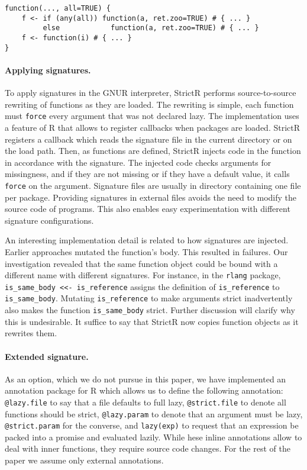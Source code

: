 \documentclass[review,nonacm,screen,acmsmall,anonymous=true]{acmart}
\newcommand{\code}[1]{\lstinline |#1|\xspace}
\renewcommand{\c}[1]{\lstinline |#1|\xspace}
\newcommand{\strictr}{{\sf StrictR}\xspace}
\begin{document}
\begin{lstlisting}
function(..., all=TRUE) {
    f <- if (any(all)) function(a, ret.zoo=TRUE) # { ... }
         else            function(a, ret.zoo=TRUE) # { ... }
    f <- function(i) # { ... }
}
\end{lstlisting}

\paragraph{Applying signatures.}
To apply signatures in the GNUR interpreter, \strictr performs source-to-source
rewriting of functions as they are loaded. The rewriting is simple, each
function must \c{force} every argument that was not declared lazy. The
implementation uses a feature of R that allows to register callbacks when
packages are loaded. \strictr registers a callback which reads the signature
file in the current directory or on the load path. Then, as functions are
defined, \strictr injects code in the function in accordance with the signature.
The injected code checks arguments for missingness, and if they are not missing
or if they have a default value, it calls \c{force} on the argument. Signature
files are usually in directory containing one file per package. Providing
signatures in external files avoids the need to modify the source code of
programs. This also enables easy experimentation with different signature
configurations.

An interesting implementation detail is related to how signatures are injected.
Earlier approaches mutated the function's body. This resulted in failures.
Our investigation revealed that the same function object could be bound with a
different name with different signatures. For instance, in the \code{rlang}
package, \code{is_same_body <<- is_reference} assigns the definition of
\code{is_reference} to \code{is_same_body}. Mutating \code{is_reference} to make
arguments strict inadvertently also makes the function \code{is_same_body}
strict. Further discussion will clarify why this is undesirable. It suffice to
say that \strictr now copies function objects as it rewrites them.

\paragraph{Extended signature.}
As an option, which we do not pursue in this paper, we have implemented an
annotation package for R which allows us to define the following annotation:
\c{@lazy.file} to say that a file defaults to full lazy, \c{@strict.file} to
denote all functions should be strict, \c{@lazy.param} to denote that an
argument must be lazy, \c{@strict.param} for the converse, and \c{lazy(exp)} to
request that an expression be packed into a promise and evaluated lazily. While
hese inline annotations allow to deal with inner functions, they require source
code changes. For the rest of the paper we assume only external annotations.
\end{document}
